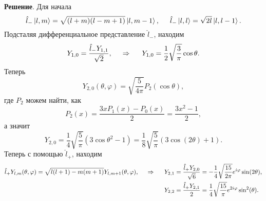 \textbf{Решение}.
Для начала 
\begin{equation*}
    \hat{l}_- \left| l, m \right\rangle = \sqrt{(l+m)(l-m+1)} \left| l,m-1 \right\rangle,
    \hspace{5 mm} 
    \hat{l}_- \left| l, l \right\rangle = \sqrt{2l} \left| l, l-1 \right\rangle.
\end{equation*}
Подсталяя дифференциальное представление $\hat{l}_-$, находим
\begin{equation*}
    Y_{1,0} = \frac{\hat{l}_- Y_{1, 1}}{\sqrt{2}},
    \hspace{0.5cm} \Rightarrow \hspace{0.5cm}
    Y_{1, 0} = \frac{1}{2} \sqrt{\frac{3}{\pi}} \cos \theta.
\end{equation*}
Теперь
\begin{equation*}
    Y_{2,0} (\theta, \varphi) = \sqrt{\frac{5}{4 \pi}} P_2 (\cos \theta),
\end{equation*}
где $P_2$ можем найти, как
\begin{equation*}
    P_2 (x) = \frac{3 x P_1 (x) - P_0(x)}{2} = \frac{3 x^2 -1}{2},
\end{equation*}
а значит
\begin{equation*}
    Y_{2, 0} = 
    \frac{1}{4} \sqrt{\frac{5}{\pi}} (3 \cos \theta^2 -1) 
    = \frac{1}{8} \sqrt{\frac{5}{\pi}} \left(3 \cos (2 \theta) + 1\right).
\end{equation*}
Теперь с помощью $\hat{l}_+$, находим
\begin{align*}
    \hat{l}_+ Y_{l,m} (\theta, \varphi) = \sqrt{l (l+1) - m (m+1)} Y_{l, m+1} (\theta, \varphi),
    \hspace{0.5cm} \Rightarrow \hspace{0.5cm}
    Y_{2, 1} &= \frac{\hat{l}_+ Y_{2,0}}{\sqrt{6}} = - \frac{1}{4} \sqrt{\frac{15}{2 \pi}} e^{i \varphi} \sin(2 \theta), \\
    Y_{2, 2} &= \frac{\hat{l}_+ Y_{2,1}}{2} =  \frac{1}{4} \sqrt{\frac{15}{\pi}} e^{2 i \varphi} \sin^2 (\theta).
\end{align*}